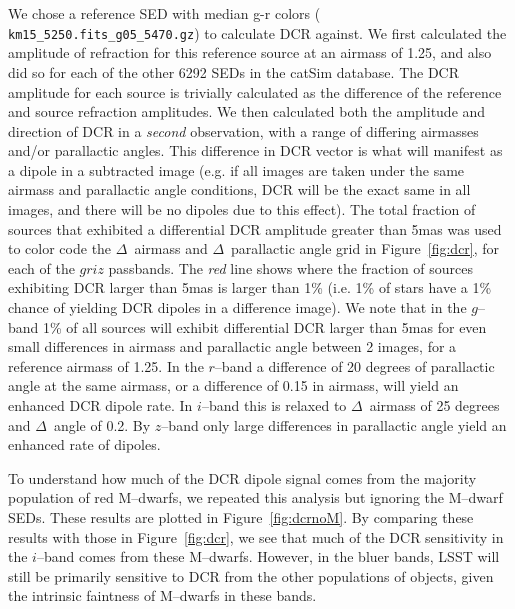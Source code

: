\documentclass[DM,toc]{lsstdoc}
\begin{document}
We chose a reference SED with median g-r colors ({\tt
  km15\_5250.fits\_g05\_5470.gz}) to calculate DCR against.  We first
calculated the amplitude of refraction for this reference source at an
airmass of 1.25, and also did so for each of the other 6292 SEDs in
the catSim database.  The DCR amplitude for each source is trivially
calculated as the difference of the reference and source refraction
amplitudes.  We then calculated both the amplitude and direction of
DCR in a {\it second} observation, with a range of differing airmasses
and/or parallactic angles.  This difference in DCR vector is what will
manifest as a dipole in a subtracted image (e.g. if all images are
taken under the same airmass and parallactic angle conditions, DCR
will be the exact same in all images, and there will be no dipoles due
to this effect).  The total fraction of sources that exhibited a
differential DCR amplitude greater than 5mas was used to color code
the $\Delta$~airmass and $\Delta$~parallactic angle grid in
Figure~\ref{fig:dcr}, for each of the $griz$ passbands.  The {\it red}
line shows where the fraction of sources exhibiting DCR larger than
5mas is larger than 1\% (i.e. 1\% of stars have a 1\% chance of
yielding DCR dipoles in a difference image).  We note that in the
$g$--band 1\% of all sources will exhibit differential DCR larger than
5mas for even small differences in airmass and parallactic angle
between 2 images, for a reference airmass of 1.25.  In the $r$--band a
difference of 20 degrees of parallactic angle at the same airmass, or
a difference of 0.15 in airmass, will yield an enhanced DCR dipole
rate.  In $i$--band this is relaxed to $\Delta$~airmass of 25 degrees
and $\Delta$~angle of 0.2.  By $z$--band only large differences in
parallactic angle yield an enhanced rate of dipoles.

To understand how much of the DCR dipole signal comes from the
majority population of red M--dwarfs, we repeated this analysis but
ignoring the M--dwarf SEDs.  These results are plotted in
Figure~\ref{fig:dcrnoM}.  By comparing these results with those in
Figure~\ref{fig:dcr}, we see that much of the DCR sensitivity in the
$i$--band comes from these M--dwarfs.  However, in the bluer bands,
LSST will still be primarily sensitive to DCR from the other
populations of objects, given the intrinsic faintness of M--dwarfs in
these bands.
\end{document}
